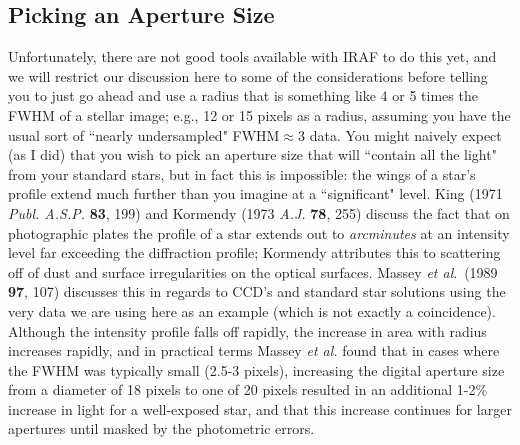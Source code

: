 \subsection{Picking an Aperture Size}
Unfortunately, there are not good tools available with IRAF to do this
yet, and we will restrict our discussion here to some of the
considerations before telling you to just go ahead and use a radius that
is something like 4 or 5 times the FWHM of a stellar image; e.g.,
12 or 15
pixels as a radius, assuming you have the usual sort of ``nearly
undersampled" FWHM$\approx3$ data.
You might naively expect (as I did) that you wish to pick an aperture
size
that will ``contain all the light" from your standard stars, but in fact
this is impossible: the wings of a star's profile extend much further
than you imagine at a ``significant" level.  King (1971 {\it Publ.
A.S.P.} {\bf 83}, 199) and Kormendy (1973 {\it A.J.} {\bf 78}, 255)
discuss the fact that on photographic plates the profile of a star
extends out to {\it arcminutes} at an intensity level far exceeding the
diffraction profile; Kormendy attributes this to scattering off of dust
and surface irregularities on the optical surfaces.
Massey {\it et al}.\ (1989 {\bf 97}, 107) discusses
this in regards to CCD's and standard star solutions using the very data
we are using here as an example (which is not exactly a coincidence).
Although the intensity profile falls off rapidly, the increase in area
with radius increases rapidly, and in practical terms Massey {\it et
al.}
found that in cases where the FWHM was typically small (2.5-3 pixels),
increasing the digital aperture size from a diameter of 18 pixels to
one of 20 pixels resulted in an additional 1-2\% increase in light
for a well-exposed star, and that this increase continues
for larger apertures until masked by the photometric errors.
 
